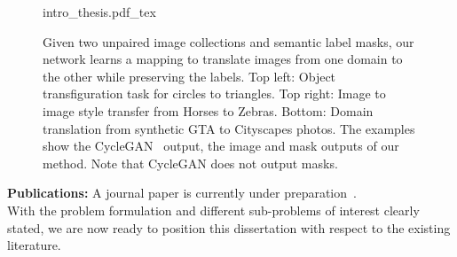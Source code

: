\begin{figure}[!htbp]
    \centering
    \def\svgwidth{\textwidth}
    {intro_thesis.pdf_tex}
    \caption[Semantics-aware image to image translation and domain transfer]{Given two unpaired image collections and semantic label masks, our network learns a mapping to translate images from one domain to the other while preserving the labels. Top left: Object transfiguration task for circles to triangles. Top right: Image to image style transfer from Horses to Zebras. Bottom: Domain translation from synthetic GTA to Cityscapes photos. The examples show the CycleGAN~\cite{zhu_unpaired_2017} output, the image and mask outputs of our method. Note that CycleGAN does not output masks.}
    \label{fig:intro_sem}
\end{figure}

\textbf{Publications:} A journal paper is currently under preparation~\cite{roy2019_semgan}.\\


With the problem formulation and different sub-problems of interest clearly stated, we are now ready to position this dissertation with respect to the existing literature.

